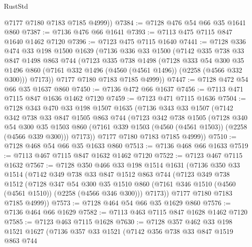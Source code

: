 \begin{lexlean}{RustStd}
\begin{coremodule}
        @7177
        @7180
        @7183
        @7185
        @4999))
@7384 := @7128 @476 @54 @66 @35 @1641 @860
@7387 := @7136 @476 @66 @1641
@7393 := @7113 @475 @7115 @847 @1640 @1462 @7120
@7396 := @7123 @475 @7115 @1640
@7441 := @7128
    @336
    @474
    @33
    @198
    @1500
    @1639
    (@7136
      @336
      @33
      @1500
      (@7142
        @335
        @738
        @33
        @847
        @1498
        @863
        @744
        (@7123
          @335
          @738
          @1498
          (@7128
            @333
            @54
            @300
            @35
            @1496
            @860
            (@7161 @332 @1496 (@4560 (@4561 @1496)) (@2258 (@4566 @332 @300)))
            @7173))
        @7177
        @7180
        @7183
        @7185
        @4999))
@7447 := @7128 @472 @54 @66 @35 @1637 @860
@7450 := @7136 @472 @66 @1637
@7456 := @7113 @471 @7115 @847 @1636 @1462 @7120
@7459 := @7123 @471 @7115 @1636
@7504 := @7128
    @343
    @470
    @33
    @198
    @1507
    @1635
    (@7136
      @343
      @33
      @1507
      (@7142
        @342
        @738
        @33
        @847
        @1505
        @863
        @744
        (@7123
          @342
          @738
          @1505
          (@7128
            @340
            @54
            @300
            @35
            @1503
            @860
            (@7161 @339 @1503 (@4560 (@4561 @1503)) (@2258 (@4566 @339 @300)))
            @7173))
        @7177
        @7180
        @7183
        @7185
        @4999))
@7510 := @7128 @468 @54 @66 @35 @1633 @860
@7513 := @7136 @468 @66 @1633
@7519 := @7113 @467 @7115 @847 @1632 @1462 @7120
@7522 := @7123 @467 @7115 @1632
@7567 := @7128
    @350
    @466
    @33
    @198
    @1514
    @1631
    (@7136
      @350
      @33
      @1514
      (@7142
        @349
        @738
        @33
        @847
        @1512
        @863
        @744
        (@7123
          @349
          @738
          @1512
          (@7128
            @347
            @54
            @300
            @35
            @1510
            @860
            (@7161 @346 @1510 (@4560 (@4561 @1510)) (@2258 (@4566 @346 @300)))
            @7173))
        @7177
        @7180
        @7183
        @7185
        @4999))
@7573 := @7128 @464 @54 @66 @35 @1629 @860
@7576 := @7136 @464 @66 @1629
@7582 := @7113 @463 @7115 @847 @1628 @1462 @7120
@7585 := @7123 @463 @7115 @1628
@7630 := @7128
    @357
    @462
    @33
    @198
    @1521
    @1627
    (@7136
      @357
      @33
      @1521
      (@7142
        @356
        @738
        @33
        @847
        @1519
        @863
        @744

\end{coremodule}
\end{lexlean}
